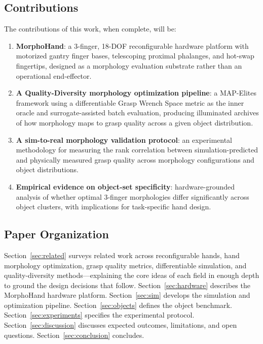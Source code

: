 \documentclass[journal]{IEEEtran}
\begin{document}
\subsection{Contributions}

The contributions of this work, when complete, will be:
\begin{enumerate}
  \item \textbf{MorphoHand}: a 3-finger, 18-DOF reconfigurable hardware platform with
    motorized gantry finger bases, telescoping proximal phalanges, and hot-swap
    fingertips, designed as a morphology evaluation substrate rather than an operational
    end-effector.
  \item \textbf{A Quality-Diversity morphology optimization pipeline}: a MAP-Elites
    framework using a differentiable Grasp Wrench Space metric as the inner oracle and
    surrogate-assisted batch evaluation, producing illuminated archives of how morphology
    maps to grasp quality across a given object distribution.
  \item \textbf{A sim-to-real morphology validation protocol}: an experimental methodology
    for measuring the rank correlation between simulation-predicted and physically measured
    grasp quality across morphology configurations and object distributions.
  \item \textbf{Empirical evidence on object-set specificity}: hardware-grounded analysis
    of whether optimal 3-finger morphologies differ significantly across object clusters,
    with implications for task-specific hand design.
\end{enumerate}

\subsection{Paper Organization}

Section~\ref{sec:related} surveys related work across reconfigurable hands, hand morphology
optimization, grasp quality metrics, differentiable simulation, and quality-diversity
methods---explaining the core ideas of each field in enough depth to ground the design
decisions that follow.
Section~\ref{sec:hardware} describes the MorphoHand hardware platform.
Section~\ref{sec:sim} develops the simulation and optimization pipeline.
Section~\ref{sec:objects} defines the object benchmark.
Section~\ref{sec:experiments} specifies the experimental protocol.
Section~\ref{sec:discussion} discusses expected outcomes, limitations, and open questions.
Section~\ref{sec:conclusion} concludes.
\end{document}
